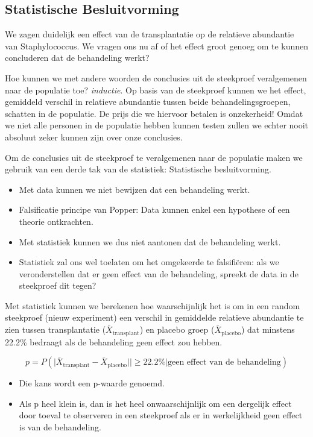 \documentclass[
  12pt,dutch,coursenotes]{book}
\theoremstyle{definition}
\theoremstyle{definition}
\theoremstyle{definition}
\theoremstyle{definition}
\theoremstyle{remark}
\begin{document}
\hypertarget{statistische-besluitvorming}{%
\subsection{Statistische Besluitvorming}\label{statistische-besluitvorming}}

We zagen duidelijk een effect van de transplantatie op de relatieve abundantie van Staphylococcus.
We vragen ons nu af of het effect groot genoeg om te kunnen concluderen dat de behandeling werkt?

Hoe kunnen we met andere woorden de conclusies uit de steekproef veralgemenen naar de populatie toe? \emph{inductie}.
Op basis van de steekproef kunnen we het effect, gemiddeld verschil in relatieve abundantie tussen beide behandelingsgroepen, schatten in de populatie.
De prijs die we hiervoor betalen is onzekerheid!
Omdat we niet alle personen in de populatie hebben kunnen testen zullen we echter nooit absoluut zeker kunnen zijn over onze conclusies.

Om de conclusies uit de steekproef te veralgemenen naar de populatie maken we gebruik van een derde tak van de statistiek:
Statistische besluitvorming.

\begin{itemize}
\item
  Met data kunnen we niet bewijzen dat een behandeling werkt.
\item
  Falsificatie principe van Popper: Data kunnen enkel een hypothese of een theorie ontkrachten.
\item
  Met statistiek kunnen we dus niet aantonen dat de behandeling werkt.
\item
  Statistiek zal ons wel toelaten om het omgekeerde te falsifiëren: als we veronderstellen dat er geen effect van de behandeling, spreekt de data in de steekproef dit tegen?
\end{itemize}

Met statistiek kunnen we berekenen hoe waarschijnlijk het is om in een random steekproef (nieuw experiment) een verschil in gemiddelde relatieve abundantie te zien tussen transplantatie (\(\bar X_\text{transplant}\)) en placebo groep (\(\bar X_\text{placebo}\)) dat minstens 22.2\% bedraagt als de behandeling geen effect zou hebben.

\[p=P( \vert \bar X_\text{transplant}-\bar X_\text{placebo}\vert \vert \geq 22.2\% \vert \text{geen effect van de behandeling})\]

\begin{itemize}
\item
  Die kans wordt een p-waarde genoemd.
\item
  Als p heel klein is, dan is het heel onwaarschijnlijk om een dergelijk effect door toeval te observeren in een steekproef als er in werkelijkheid geen effect is van de behandeling.
\end{itemize}
\end{document}
